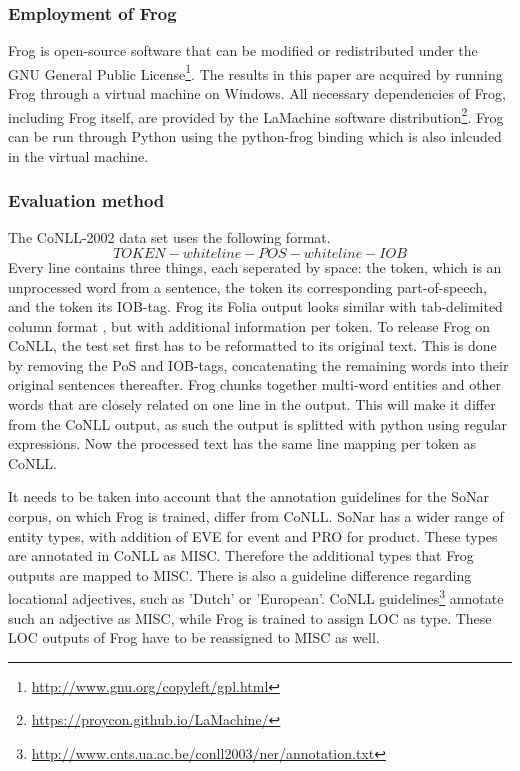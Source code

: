 \subsubsection{Employment of Frog}
Frog is open-source software that can be modified or redistributed under the GNU General Public License\footnote{\url{http://www.gnu.org/copyleft/gpl.html}}. The results in this paper are acquired by running Frog through a virtual machine on Windows. All necessary dependencies of Frog, including Frog itself, are provided by the LaMachine software distribution\footnote{\url{https://proycon.github.io/LaMachine/}}. Frog can be run through Python using the python-frog binding which is also inlcuded in the virtual machine.

\subsubsection{Evaluation method}
The CoNLL-2002 data set uses the following format. $$TOKEN -whiteline- POS -whiteline- IOB$$ Every line contains three things, each seperated by space: the token, which is an unprocessed word from a sentence, the token its corresponding part-of-speech, and the token its IOB-tag. Frog its Folia output looks similar with tab-delimited column format , but with additional information per token. To release Frog on CoNLL, the test set first has to be reformatted to its original text. This is done by removing the PoS and IOB-tags, concatenating the remaining words into their original sentences thereafter.  Frog chunks together multi-word entities and other words that are closely related on one line in the output. This will make it differ from the CoNLL output, as such the output is splitted with python using regular expressions. Now the processed text has the same line mapping per token as CoNLL.

It needs to be taken into account that the annotation guidelines for the SoNar corpus, on which Frog is trained, differ from CoNLL. SoNar has a wider range of entity types, with addition of EVE for event and PRO for product. These types are annotated in CoNLL as MISC. Therefore the additional types that Frog outputs are mapped to MISC. There is also a guideline difference regarding locational adjectives, such as 'Dutch' or 'European'. CoNLL guidelines\footnote{\url{http://www.cnts.ua.ac.be/conll2003/ner/annotation.txt}} annotate such an adjective as MISC, while Frog is trained to assign LOC as type. These LOC outputs of Frog have to be reassigned to MISC as well.

